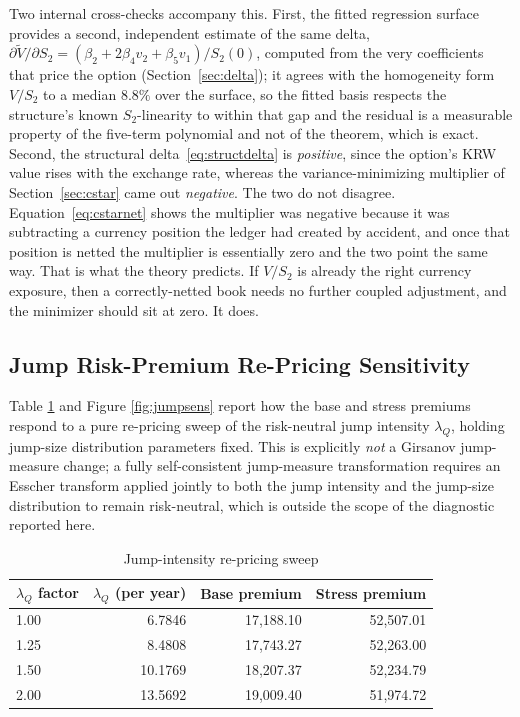 \documentclass[11pt,a4paper]{article}
\begin{document}
Two internal cross-checks accompany this. First, the fitted regression surface provides a second, independent estimate of the same delta, $\partial\tilde V/\partial S_2 = (\beta_2+2\beta_4 v_2+\beta_5 v_1)/S_2(0)$, computed from the very coefficients that price the option (Section~\ref{sec:delta}); it agrees with the homogeneity form $V/S_2$ to a median $8.8\%$ over the surface, so the fitted basis respects the structure's known $S_2$-linearity to within that gap and the residual is a measurable property of the five-term polynomial and not of the theorem, which is exact. Second, the structural delta~\eqref{eq:structdelta} is \emph{positive}, since the option's KRW value rises with the exchange rate, whereas the variance-minimizing multiplier of Section~\ref{sec:cstar} came out \emph{negative}. The two do not disagree. Equation~\eqref{eq:cstarnet} shows the multiplier was negative because it was subtracting a currency position the ledger had created by accident, and once that position is netted the multiplier is essentially zero and the two point the same way. That is what the theory predicts. If $V/S_2$ is already the right currency exposure, then a correctly-netted book needs no further coupled adjustment, and the minimizer should sit at zero. It does.

\subsection{Jump Risk-Premium Re-Pricing Sensitivity}
\label{sec:jumpsens}

Table \ref{tab:jumpsens} and Figure \ref{fig:jumpsens} report how the base and stress premiums respond to a pure re-pricing sweep of the risk-neutral jump intensity $\lambda_Q$, holding jump-size distribution parameters fixed. This is explicitly \emph{not} a Girsanov jump-measure change; a fully self-consistent jump-measure transformation requires an Esscher transform applied jointly to both the jump intensity and the jump-size distribution to remain risk-neutral, which is outside the scope of the diagnostic reported here.

\begin{table}[h]
\centering
\caption{Jump-intensity re-pricing sweep}
\label{tab:jumpsens}
\begin{tabular}{lrrr}
\toprule
$\lambda_Q$ factor & $\lambda_Q$ (per year) & Base premium & Stress premium \\
\midrule
1.00 & 6.7846 & 17{,}188.10 & 52{,}507.01 \\
1.25 & 8.4808 & 17{,}743.27 & 52{,}263.00 \\
1.50 & 10.1769 & 18{,}207.37 & 52{,}234.79 \\
2.00 & 13.5692 & 19{,}009.40 & 51{,}974.72 \\
\bottomrule
\end{tabular}
\end{table}
\end{document}
